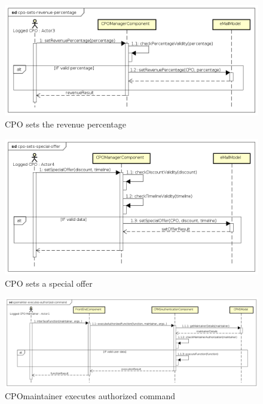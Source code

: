 \begin{figure}[!h]
    \begin{center}
        \includegraphics[keepaspectratio, width=16cm]{Sequence/cpo-sets-revenue-percentage.png}
        \caption{\ac{CPO} sets the revenue percentage}
        \label{fig:cpo-sets-revenue-percentage}
    \end{center}
\end{figure}
\begin{figure}[!h]
    \begin{center}
        \includegraphics[keepaspectratio, width=16cm]{Sequence/cpo-sets-special-offer.png}
        \caption{\ac{CPO} sets a special offer}
        \label{fig:cpo-sets-speciale-offer}
    \end{center}
\end{figure}
\begin{figure}[!h]
    \begin{center}
        \includegraphics[keepaspectratio, width=16cm]{Sequence/cpomaintainer-executes-authorized-command.png}
        \caption{\ac{CPO}maintainer executes authorized command}
        \label{fig:cpomaintainer-executes-authorized-command}
    \end{center}
\end{figure}
